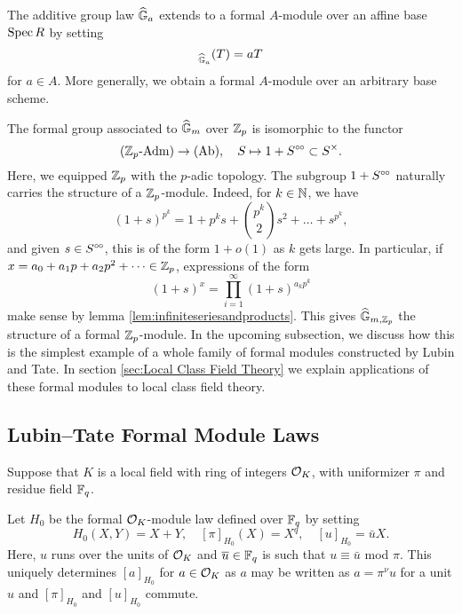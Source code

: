 \documentclass[../main.tex]{subfiles}
\begin{document}
\begin{xpl}
  The additive group law $\widehat{\mathbb{G}}_a$ extends to a formal $A$-module over an affine base
  $\operatorname{Spec} R$ by setting 
  \begin{equation*}
    [a]_{\GG_a}(T) = aT
  \end{equation*}
  for $a \in A$. More generally, we obtain a formal $A$-module over an arbitrary base
  scheme.

  The formal group associated to $\widehat{\mathbb{G}}_m$ over $\mathbb{Z}_p$ is isomorphic to the functor
  \begin{equation*}
    {({\mathbb{Z}_p}\text-\mathrm{Adm})} \to {(\mathrm{Ab})}, \quad S \mapsto 1 + S^{\circ \hspace{-0.5pt} \circ} \subset S^\times.
  \end{equation*}
  Here, we equipped $\mathbb{Z}_p$ with the $p$-adic topology.
  The subgroup $1 + S^{\circ \hspace{-0.5pt} \circ}$ naturally carries the structure of a $\mathbb{Z}_p$-module.
  Indeed, for $k \in \mathbb{N}$, we have
  \begin{equation*}
    (1+s)^{p^k} = 1 + p^ks + \binom{p^k}2 s^2 + \dots + s^{p^k},
  \end{equation*}
  and given $s \in S^{\circ \hspace{-0.5pt} \circ}$, this is of the form $1+ o(1)$ as $k$ gets large. 
  In particular, if $x = a_0 + a_1 p + a_2p^2 + \dots \in \mathbb{Z}_p$, expressions of the form
  \begin{equation*}
    (1+s)^x = \prod_{i = 1}^\infty (1+s)^{a_k p^k}
  \end{equation*}
  make sense by lemma \ref{lem:infiniteseriesandproducts}. This gives
  $\widehat{\mathbb{G}}_{m,\mathbb{Z}_p}$ the structure of a formal $\mathbb{Z}_p$-module. 
  In the upcoming subsection, we discuss how this is the simplest example of a
  whole family of formal modules constructed by 
  Lubin and Tate. In section \ref{sec:Local Class Field Theory} we explain applications of these formal modules to local class field theory.
\end{xpl}

\subsection{Lubin--Tate Formal Module Laws} %
\label{sub:Lubin--Tate Formal Module Laws}
Suppose that $K$ is a local field with ring of integers $\mathcal{O}_K$, with uniformizer
$\pi$ and residue field $\mathbb{F}_q$. 

Let $H_0$ be the formal $\mathcal{O}_K$-module law defined over $\mathbb{F}_q$ by setting
\begin{equation*}
  H_0(X,Y) = X + Y, \quad [\pi]_{H_0}(X) = X^q, \quad [u]_{H_0}= \bar u X.
\end{equation*}
Here, $u$ runs over the units of $\mathcal{O}_K$ and $\overline u \in \mathbb{F}_q$ is such that 
$u \equiv \bar u$ mod $\pi$. This uniquely determines $[a]_{H_0}$ 
for $a \in \mathcal{O}_K$ as $a$ may be written as $a = \pi^{\nu} u$ for a unit $u$ and
$[\pi]_{H_0}$ and $[u]_{H_0}$ commute. 
\end{document}
